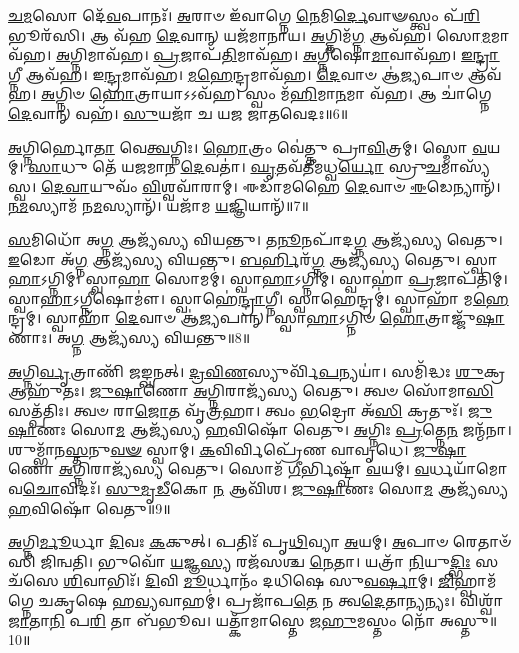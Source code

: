 \-\ul{𑌚}\-\-\ul{𑌮}\-𑌸𑍋 𑌦𑍇᳴\-\ul{𑌵}\-𑌪𑌾𑌨𑌃᳴।
\-\ul{𑌅}\-𑌰𑌾𑍞 𑌇᳴𑌵𑌾𑌗𑍍𑌨𑍇 \ul{𑌨𑍇}\-𑌮𑌿\-\ul{𑌰𑍍𑌦𑍇}\-𑌵𑌾𑍟𑌸𑍍𑌤𑍍𑌵𑌂 𑌪᳴\-\ul{𑌰𑌿}\-𑌭𑍂𑌰᳴𑌸𑌿।
𑌆 𑌵᳴𑌹 \ul{𑌦𑍇}\-𑌵𑌾𑌨𑍍 𑌯𑌜᳴𑌮𑌾𑌨𑌾𑌯।
\-\ul{𑌅}\-𑌗𑍍𑌨𑌿𑌮᳴\-\ul{𑌗𑍍𑌨} 𑌆𑌵᳴𑌹।
𑌸𑍋\-\ul{𑌮}\-𑌮𑌾𑌵᳴𑌹।
\-\ul{𑌅}\-𑌗𑍍𑌨𑌿𑌮𑌾𑌵᳴𑌹।
\-\ul{𑌪𑍍𑌰}\-𑌜𑌾𑌪᳴\-\ul{𑌤𑌿}\-𑌮𑌾𑌵᳴𑌹।
\-\ul{𑌅}\-𑌗𑍍𑌨𑍀𑌷𑍋\-\ul{𑌮𑌾}\-𑌵𑌾𑌵᳴𑌹।
\-\ul{𑌇}\-\-\ul{𑌨𑍍𑌦𑍍𑌰𑌾}\-𑌗𑍍𑌨𑍀 𑌆𑌵᳴𑌹।
𑌇\-\ul{𑌨𑍍𑌦𑍍𑌰}\-𑌮𑌾𑌵᳴𑌹।
\-\ul{𑌮}\-\-\ul{𑌹𑍇}\-𑌨𑍍𑌦𑍍𑌰𑌮𑌾𑌵᳴𑌹।
\-\ul{𑌦𑍇}\-𑌵𑌾𑍞 𑌆॑\-\ul{𑌜𑍍𑌯}\-𑌪𑌾𑍞 𑌆𑌵᳴𑌹।
\-\ul{𑌅}\-𑌗𑍍𑌨𑌿𑍞 \ul{𑌹𑍋}\-𑌤𑍍𑌰𑌾𑌯𑌾𑌽𑌽𑌵᳴𑌹।
𑌸𑍍𑌵𑌂 𑌮᳴\-\ul{𑌹𑌿}\-𑌮𑌾\-\ul{𑌨}\-𑌮𑌾 𑌵᳴𑌹।
𑌆 𑌚𑌾॑𑌗𑍍𑌨𑍇 \ul{𑌦𑍇}\-𑌵𑌾𑌨𑍍 𑌵𑌹᳴।
\-\ul{𑌸𑍁}\-𑌯𑌜𑌾᳴ 𑌚 𑌯𑌜 𑌜𑌾𑌤𑌵𑍇𑌦𑌃॥6॥\anuvakamend[\-\ul{𑌦𑍇}\-𑌵𑌾\-\ul{𑌨𑌾}\-𑌮𑌿\-\ul{𑌨𑍍𑌦𑍍𑌰}\-𑌮𑌾 𑌵᳴\-\ul{𑌹} 𑌷𑌟𑍍 𑌚᳴]

\-\ul{𑌅}\-𑌗𑍍𑌨𑌿𑌰𑍍\mbox{}𑌹𑍋\-\ul{𑌤𑌾} 𑌵𑍇\-\ul{𑌤𑍍𑌵}\-𑌗𑍍𑌨𑌿𑌃।
\-\ul{𑌹𑍋}\-𑌤𑍍𑌰𑌂 𑌵𑍇॑𑌤𑍍𑌤𑍁 𑌪𑍍𑌰𑌾\-\ul{𑌵𑌿}\-𑌤𑍍𑌰𑌮𑍍।
𑌸𑍍𑌮𑍋 \ul{𑌵}\-𑌯𑌮𑍍।
\-\ul{𑌸𑌾}\-𑌧𑍁 𑌤𑍇᳴ 𑌯𑌜𑌮𑌾𑌨 \ul{𑌦𑍇}\-𑌵𑌤𑌾॑।
\-\ul{𑌘𑍃}\-𑌤𑌵᳴𑌤𑍀𑌮𑌧𑍍𑌵\-\ul{𑌰𑍍𑌯𑍋} 𑌸𑍍𑌰𑍁\-\ul{𑌚}\-𑌮𑌾𑌸𑍍𑌯᳴𑌸𑍍𑌵।
\-\ul{𑌦𑍇}\-\-\ul{𑌵𑌾}\-𑌯𑍁𑌵𑌂᳴ \ul{𑌵𑌿}\-𑌶𑍍𑌵𑌵𑌾᳴𑌰𑌾𑌮𑍍।
𑌈𑌡𑌾᳴𑌮𑌹𑍈 \ul{𑌦𑍇}\-𑌵𑌾𑍞 \ul{𑌈}\-𑌡𑍇𑌨𑍍𑌯𑌾𑌨𑍍᳴।
\-\ul{𑌨}\-\-\ul{𑌮}\-𑌸𑍍𑌯𑌾𑌮᳴ 𑌨\-\ul{𑌮}\-𑌸𑍍𑌯𑌾𑌨𑍍᳴।
𑌯𑌜𑌾᳴𑌮 \ul{𑌯}\-𑌜𑍍𑌞𑌿𑌯𑌾𑌨𑍍᳴॥7॥\anuvakamend[\-\ul{𑌅}\-𑌗𑍍𑌨𑌿𑌰𑍍‌\mbox{}𑌹𑍋\-\ul{𑌤𑌾} 𑌨𑌵᳴]

\-\ul{𑌸}\-𑌮𑌿𑌧𑍋᳴ 𑌅\-\ul{𑌗𑍍𑌨} 𑌆𑌜𑍍𑌯᳴𑌸𑍍𑌯 𑌵𑌿𑌯𑌨𑍍𑌤𑍁।
𑌤\-\ul{𑌨𑍂}\-𑌨𑌪𑌾᳴𑌦\-\ul{𑌗𑍍𑌨} 𑌆𑌜𑍍𑌯᳴𑌸𑍍𑌯 𑌵𑍇𑌤𑍁।
\-\ul{𑌇}\-𑌡𑍋 𑌅᳴\-\ul{𑌗𑍍𑌨} 𑌆𑌜𑍍𑌯᳴𑌸𑍍𑌯 𑌵𑌿𑌯𑌨𑍍𑌤𑍁।
\-\ul{𑌬}\-\-\ul{𑌰𑍍}\-𑌹𑌿𑌰᳴\-\ul{𑌗𑍍𑌨} 𑌆𑌜𑍍𑌯᳴𑌸𑍍𑌯 𑌵𑍇𑌤𑍁।
𑌸𑍍𑌵𑌾\-\ul{𑌹𑌾}\-\-𑌽𑌗𑍍𑌨𑌿𑌮𑍍।
𑌸𑍍𑌵𑌾\-\ul{𑌹𑌾} 𑌸𑍋𑌮𑌮𑍍॑।
𑌸𑍍𑌵𑌾\-\ul{𑌹𑌾}\-\-𑌽𑌗𑍍𑌨𑌿𑌮𑍍।
𑌸𑍍𑌵𑌾𑌹𑌾॑ \ul{𑌪𑍍𑌰}\-𑌜𑌾𑌪᳴𑌤𑌿𑌮𑍍।
𑌸𑍍𑌵𑌾\-\ul{𑌹𑌾}\-\-𑌽𑌗𑍍𑌨𑍀𑌷𑍋𑌮𑍗॑।
𑌸𑍍𑌵𑌾𑌹𑍇॑\-\ul{𑌨𑍍𑌦𑍍𑌰𑌾}\-𑌗𑍍𑌨𑍀।
𑌸𑍍𑌵𑌾𑌹𑍇𑌨𑍍𑌦𑍍𑌰𑌮𑍍॑।
𑌸𑍍𑌵𑌾𑌹𑌾᳴ 𑌮\-\ul{𑌹𑍇}\-𑌨𑍍𑌦𑍍𑌰𑌮𑍍।
𑌸𑍍𑌵𑌾𑌹𑌾᳴ \ul{𑌦𑍇}\-𑌵𑌾𑍞 𑌆॑\-\ul{𑌜𑍍𑌯}\-𑌪𑌾𑌨𑍍।
𑌸𑍍𑌵𑌾\-\ul{𑌹𑌾}\-\-𑌽𑌗𑍍𑌨𑌿𑍞 \ul{𑌹𑍋}\-𑌤𑍍𑌰𑌾𑌜𑍍𑌜𑍁᳴\-\ul{𑌷𑌾}\-𑌣𑌾𑌃।
𑌅\-\ul{𑌗𑍍𑌨} 𑌆𑌜𑍍𑌯᳴𑌸𑍍𑌯 𑌵𑌿𑌯𑌨𑍍𑌤𑍁॥8॥\anuvakamend[\-\ul{𑌇}\-\-\ul{𑌨𑍍𑌦𑍍𑌰𑌾}\-𑌗𑍍𑌨𑍀 𑌪𑌞𑍍𑌚᳴ 𑌚]

\-\ul{𑌅}\-𑌗𑍍𑌨𑌿\-\ul{𑌰𑍍𑌵𑍃}\-𑌤𑍍𑌰𑌾𑌣𑌿᳴ 𑌜𑌙𑍍𑌘𑌨𑌤𑍍।
\-\ul{𑌦𑍍𑌰}\-\-\ul{𑌵𑌿}\-\-\ul{𑌣}\-𑌸𑍍𑌯𑍁𑌰𑍍𑌵𑌿᳴\-\ul{𑌪}\-𑌨𑍍𑌯𑌯𑌾॑।
𑌸𑌮𑌿᳴𑌦𑍍𑌧𑌃 \ul{𑌶𑍁}\-𑌕𑍍𑌰 𑌆𑌹𑍁᳴𑌤𑌃।
\-\ul{𑌜𑍁}\-\-\ul{𑌷𑌾}\-𑌣𑍋 \ul{𑌅}\-𑌗𑍍𑌨𑌿𑌰𑌾𑌜𑍍𑌯᳴𑌸𑍍𑌯 𑌵𑍇𑌤𑍁।
𑌤𑍍𑌵𑍞 𑌸𑍋᳴𑌮𑌾\-\ul{𑌸𑌿} 𑌸𑌤𑍍𑌪᳴𑌤𑌿𑌃।
𑌤𑍍𑌵𑍞 𑌰𑌾\-\ul{𑌜𑍋}\-𑌤 𑌵𑍃᳴\-\ul{𑌤𑍍𑌰}\-𑌹𑌾।
𑌤𑍍𑌵𑌂 \ul{𑌭}\-𑌦𑍍𑌰𑍋 𑌅᳴\-\ul{𑌸𑌿} 𑌕𑍍𑌰𑌤𑍁𑌃᳴।
\-\ul{𑌜𑍁}\-\-\ul{𑌷𑌾}\-𑌣𑌃 𑌸𑍋\-\ul{𑌮} 𑌆𑌜𑍍𑌯᳴𑌸𑍍𑌯 \ul{𑌹}\-𑌵𑌿𑌷𑍋᳴ 𑌵𑍇𑌤𑍁।
\-\ul{𑌅}\-𑌗𑍍𑌨𑌿𑌃 \ul{𑌪𑍍𑌰}\-𑌤𑍍𑌨𑍇\-\ul{𑌨} 𑌜𑌨𑍍𑌮᳴𑌨𑌾।
𑌶𑍁𑌮𑍍𑌭𑌾᳴𑌨\-\ul{𑌸𑍍𑌤}\-𑌨𑍁\-\ul{𑌵}\-\-\ul{𑍟} 𑌸𑍍𑌵𑌾𑌮𑍍।
\-\ul{𑌕}\-𑌵𑌿𑌰𑍍𑌵𑌿𑌪𑍍𑌰𑍇᳴𑌣 𑌵𑌾𑌵𑍃𑌧𑍇।
\-\ul{𑌜𑍁}\-\-\ul{𑌷𑌾}\-𑌣𑍋 \ul{𑌅}\-𑌗𑍍𑌨𑌿𑌰𑌾𑌜𑍍𑌯᳴𑌸𑍍𑌯 𑌵𑍇𑌤𑍁।
𑌸𑍋𑌮᳴ \ul{𑌗𑍀}\-𑌰𑍍𑌭𑌿𑌷𑍍𑌟𑍍𑌵𑌾᳴ \ul{𑌵}\-𑌯𑌮𑍍।
\-\ul{𑌵}\-𑌰𑍍𑌧𑌯𑌾᳴𑌮𑍋 𑌵\-\ul{𑌚𑍋}\-𑌵𑌿𑌦𑌃᳴।
\-\ul{𑌸𑍁}\-\-\ul{𑌮𑍃}\-\-\ul{𑌡𑍀}\-𑌕𑍋 \ul{𑌨} 𑌆𑌵𑌿᳴𑌶।
\-\ul{𑌜𑍁}\-\-\ul{𑌷𑌾}\-𑌣𑌃 𑌸𑍋\-\ul{𑌮} 𑌆𑌜𑍍𑌯᳴𑌸𑍍𑌯 \ul{𑌹}\-𑌵𑌿𑌷𑍋᳴ 𑌵𑍇𑌤𑍁॥9॥\anuvakamend[𑌸𑍍𑌵𑌾𑍞 𑌷𑌟𑍍 𑌚᳴]

\-\ul{𑌅}\-𑌗𑍍𑌨𑌿\-\ul{𑌰𑍍𑌮𑍂}\-𑌰𑍍𑌧𑌾 \ul{𑌦𑌿}\-𑌵𑌃 \ul{𑌕}\-𑌕𑍁𑌤𑍍।
𑌪𑌤𑌿𑌃᳴ 𑌪𑍃\-\ul{𑌥𑌿}\-𑌵𑍍𑌯𑌾 \ul{𑌅}\-𑌯𑌮𑍍।
\-\ul{𑌅}\-𑌪𑌾𑍞 𑌰𑍇𑌤𑌾𑍞᳴𑌸𑌿 𑌜𑌿𑌨𑍍𑌵𑌤𑌿।
𑌭𑍁𑌵𑍋᳴ \ul{𑌯}\-𑌜𑍍𑌞\-\ul{𑌸𑍍𑌯} 𑌰𑌜᳴𑌸𑌶𑍍𑌚 \ul{𑌨𑍇}\-𑌤𑌾।
𑌯𑌤𑍍𑌰𑌾᳴ \ul{𑌨𑌿}\-𑌯𑍁\-\ul{𑌦𑍍𑌭𑌿𑌃} 𑌸𑌚᳴𑌸𑍇 \ul{𑌶𑌿}\-𑌵𑌾𑌭𑌿𑌃᳴।
\-\ul{𑌦𑌿}\-𑌵𑌿 \ul{𑌮𑍂}\-𑌰𑍍𑌧𑌾𑌨𑌂᳴ 𑌦𑌧𑌿𑌷𑍇 𑌸𑍁\-\ul{𑌵}\-\-\ul{𑌰𑍍}\-𑌷𑌾𑌮𑍍।
\-\ul{𑌜𑌿}\-𑌹𑍍𑌵𑌾𑌮᳴𑌗𑍍𑌨𑍇 𑌚𑌕𑍃𑌷𑍇 𑌹\-\ul{𑌵𑍍𑌯}\-𑌵𑌾𑌹𑌮𑍍॑।
𑌪𑍍𑌰𑌜𑌾᳴𑌪\-\ul{𑌤𑍇} 𑌨 𑌤𑍍𑌵\-\ul{𑌦𑍇}\-𑌤𑌾\-\ul{𑌨𑍍𑌯}\-𑌨𑍍𑌯𑌃।
𑌵𑌿𑌶𑍍𑌵𑌾᳴ \ul{𑌜𑌾}\-𑌤𑌾\-\ul{𑌨𑌿} 𑌪\-\ul{𑌰𑌿} 𑌤𑌾 𑌬᳴𑌭𑍂𑌵।
𑌯𑌤𑍍𑌕𑌾᳴𑌮𑌾𑌸𑍍𑌤𑍇 𑌜\-\ul{𑌹𑍁}\-𑌮𑌸𑍍𑌤𑌂 𑌨𑍋᳴ 𑌅𑌸𑍍𑌤𑍁॥10॥

